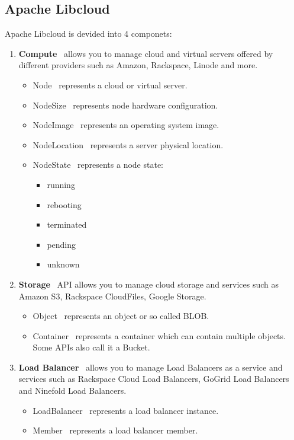 \subsection{Apache Libcloud}
Apache Libcloud is devided into 4 componets:
\begin{enumerate}
  \item {\bf Compute} \textendash\ allows you to manage cloud and virtual servers offered by different providers 
  such as Amazon, Rackspace, Linode and more.
  \begin{itemize}
    \item Node \textendash\ represents a cloud or virtual server.
    \item NodeSize \textendash\ represents node hardware configuration.
    \item NodeImage \textendash\ represents an operating system image.
    \item NodeLocation \textendash\ represents a server physical location.
    \item NodeState \textendash\ represents a node state:
    \begin{itemize}
      \item running 
      \item rebooting
      \item terminated
      \item pending 
      \item unknown
    \end{itemize}
  \end{itemize}
  \item {\bf Storage} \textendash\ API allows you to manage cloud storage and services such as Amazon S3, Rackspace 
  CloudFiles, Google Storage.
  \begin{itemize}
    \item Object \textendash\ represents an object or so called BLOB.
    \item Container \textendash\ represents a container which can contain multiple objects. Some APIs also call it a Bucket.
  \end{itemize}
  \item {\bf Load Balancer} \textendash\  allows you to manage Load Balancers as a service and services such as Rackspace 
  Cloud Load Balancers, GoGrid Load Balancers and Ninefold Load Balancers.
  \begin{itemize}
    \item LoadBalancer \textendash\ represents a load balancer instance.
    \item Member \textendash\ represents a load balancer member.

\end{itemize}
\end{enumerate}

